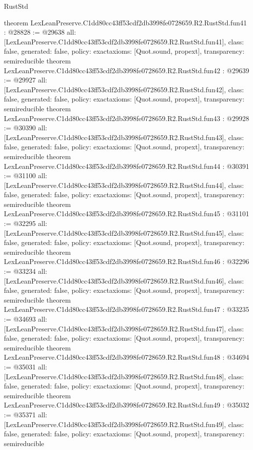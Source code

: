 \begin{lexlean}{RustStd}
\begin{coremodule}
{}
theorem LexLeanPreserve.C1dd80cc43ff53cdf2db3998fe0728659.R2.RustStd.fun41 : @28828 := @29638 {
  all: [LexLeanPreserve.C1dd80cc43ff53cdf2db3998fe0728659.R2.RustStd.fun41],
  class: false,
  generated: false,
  policy: exact{axioms: [Quot.sound, propext]},
  transparency: semireducible
}
theorem LexLeanPreserve.C1dd80cc43ff53cdf2db3998fe0728659.R2.RustStd.fun42 : @29639 := @29927 {
  all: [LexLeanPreserve.C1dd80cc43ff53cdf2db3998fe0728659.R2.RustStd.fun42],
  class: false,
  generated: false,
  policy: exact{axioms: [Quot.sound, propext]},
  transparency: semireducible
}
theorem LexLeanPreserve.C1dd80cc43ff53cdf2db3998fe0728659.R2.RustStd.fun43 : @29928 := @30390 {
  all: [LexLeanPreserve.C1dd80cc43ff53cdf2db3998fe0728659.R2.RustStd.fun43],
  class: false,
  generated: false,
  policy: exact{axioms: [Quot.sound, propext]},
  transparency: semireducible
}
theorem LexLeanPreserve.C1dd80cc43ff53cdf2db3998fe0728659.R2.RustStd.fun44 : @30391 := @31100 {
  all: [LexLeanPreserve.C1dd80cc43ff53cdf2db3998fe0728659.R2.RustStd.fun44],
  class: false,
  generated: false,
  policy: exact{axioms: [Quot.sound, propext]},
  transparency: semireducible
}
theorem LexLeanPreserve.C1dd80cc43ff53cdf2db3998fe0728659.R2.RustStd.fun45 : @31101 := @32295 {
  all: [LexLeanPreserve.C1dd80cc43ff53cdf2db3998fe0728659.R2.RustStd.fun45],
  class: false,
  generated: false,
  policy: exact{axioms: [Quot.sound, propext]},
  transparency: semireducible
}
theorem LexLeanPreserve.C1dd80cc43ff53cdf2db3998fe0728659.R2.RustStd.fun46 : @32296 := @33234 {
  all: [LexLeanPreserve.C1dd80cc43ff53cdf2db3998fe0728659.R2.RustStd.fun46],
  class: false,
  generated: false,
  policy: exact{axioms: [Quot.sound, propext]},
  transparency: semireducible
}
theorem LexLeanPreserve.C1dd80cc43ff53cdf2db3998fe0728659.R2.RustStd.fun47 : @33235 := @34693 {
  all: [LexLeanPreserve.C1dd80cc43ff53cdf2db3998fe0728659.R2.RustStd.fun47],
  class: false,
  generated: false,
  policy: exact{axioms: [Quot.sound, propext]},
  transparency: semireducible
}
theorem LexLeanPreserve.C1dd80cc43ff53cdf2db3998fe0728659.R2.RustStd.fun48 : @34694 := @35031 {
  all: [LexLeanPreserve.C1dd80cc43ff53cdf2db3998fe0728659.R2.RustStd.fun48],
  class: false,
  generated: false,
  policy: exact{axioms: [Quot.sound, propext]},
  transparency: semireducible
}
theorem LexLeanPreserve.C1dd80cc43ff53cdf2db3998fe0728659.R2.RustStd.fun49 : @35032 := @35371 {
  all: [LexLeanPreserve.C1dd80cc43ff53cdf2db3998fe0728659.R2.RustStd.fun49],
  class: false,
  generated: false,
  policy: exact{axioms: [Quot.sound, propext]},
  transparency: semireducible
}
\end{coremodule}
\end{lexlean}
